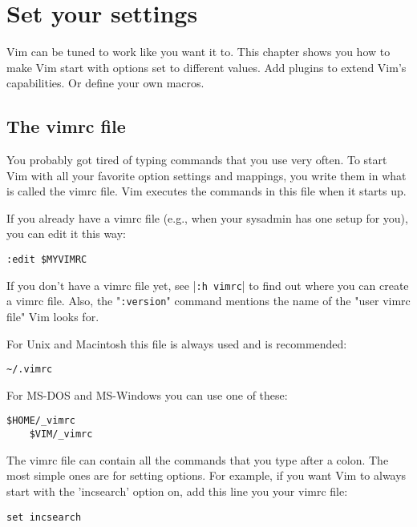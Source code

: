 \section{Set your settings}
Vim can be tuned to work like you want it to.  This chapter shows you how to
make Vim start with options set to different values.  Add plugins to extend
Vim's capabilities.  Or define your own macros.
\subsection{The vimrc file}
\label{The vimrc file}
\label{vimrc-intro}

You probably got tired of typing commands that you use very often.
To start Vim with all your favorite option settings and mappings, you write them in what is called the vimrc file.
Vim executes the commands in this file when it starts up.

If you already have a vimrc file (e.g., when your sysadmin has one setup for you), you can edit it this way:

 \begin{Verbatim}[samepage=true]
 :edit $MYVIMRC
 \end{Verbatim}

If you don't have a vimrc file yet, see |\verb!:h vimrc!| to find out where you can create a vimrc file.
Also, the "\verb!:version!" command mentions the name of the "user vimrc file" Vim looks for.

For Unix and Macintosh this file is always used and is recommended:

\begin{Verbatim}[samepage=true]
    ~/.vimrc 
\end{Verbatim}

For MS-DOS and MS-Windows you can use one of these:

\begin{Verbatim}[samepage=true]
    $HOME/_vimrc 
    $VIM/_vimrc 
\end{Verbatim}

The vimrc file can contain all the commands that you type after a colon.
The most simple ones are for setting options.
For example, if you want Vim to always start with the 'incsearch' option on, add this line you your vimrc file:

 \begin{Verbatim}[samepage=true]
 set incsearch
 \end{Verbatim}

